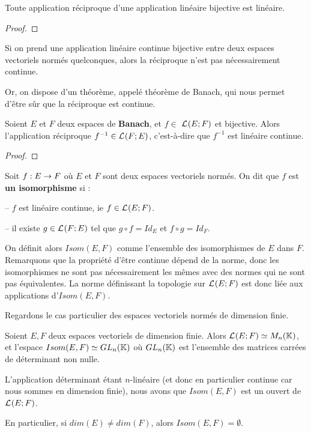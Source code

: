 \begin{proposition}
	Toute application réciproque d'une application linéaire bijective est
	linéaire.
\end{proposition}

\ifdefined\outputproof
\begin{proof}

\end{proof}
\fi

Si on prend une application linéaire continue bijective entre deux espaces
vectoriels normés quelconques, alors la réciproque n'est pas nécessairement
continue.

Or, on dispose d'un théorème, appelé théorème de Banach, qui nous permet d'être
sûr que la réciproque est continue.

\begin{theorem} [Banach]
	\label{theorem_banach_isomorphism}
	Soient $E$ et $F$ deux espaces de \textbf{Banach}, et $f \in$
	$\mathcal{L}_{}(E; F)$ et bijective.
	Alors l'application réciproque $f^{-1} \in \mathcal{L}_{}(F; E)$,
	c'est-à-dire que $f^{-1}$ est linéaire continue.
\end{theorem}

\ifdefined\outputproof
\begin{proof}

\end{proof}
\fi

\begin{definition}
\label{definition:isomorphisme}
	Soit $f : E \rightarrow F$ où $E$ et $F$ sont deux espaces vectoriels
	normés.
	On dit que $f$ est \textbf{un isomorphisme} si :

	-- $f$ est linéaire continue, ie $f \in \mathcal{L}_{}(E; F)$.

	-- il existe $g \in \mathcal{L}_{}(F; E)$ tel que $g \circ f = Id_{E}$ et
	$f \circ g = Id_{F}$.
\end{definition}

On définit alors $Isom(E, F)$ comme l'ensemble des isomorphismes de $E$ dans
$F$.
Remarquons que la propriété d'être continue dépend de la norme, donc les
isomorphismes ne sont pas nécessairement les mêmes avec des normes qui ne sont
pas équivalentes. La norme définissant la topologie sur $\mathcal{L}_{}(E; F)$
est donc liée aux applications d'$Isom(E, F)$.

Regardons le cas particulier des espaces vectoriels normés de dimension finie.

\begin{remarque}
	Soient $E, F$ deux espaces vectoriels de dimension finie. Alors
	$\mathcal{L}_{}(E; F) \simeq M_{n}(\mathbb{K})$, et l'espace
	$Isom(E, F) \simeq GL_{n}(\mathbb{K})$ où
	$GL_{n}(\mathbb{K})$ est l'ensemble des matrices carrées
	de déterminant non nulle.

	L'application déterminant étant $n$-linéaire (et donc en particulier
	continue car nous sommes en dimension finie), nous avons que $Isom(E, F)$
	est un ouvert de $\mathcal{L}_{}(E; F)$.

	En particulier, si $dim(E) \neq dim(F)$, alors $Isom(E, F) = \emptyset$.
\end{remarque}

